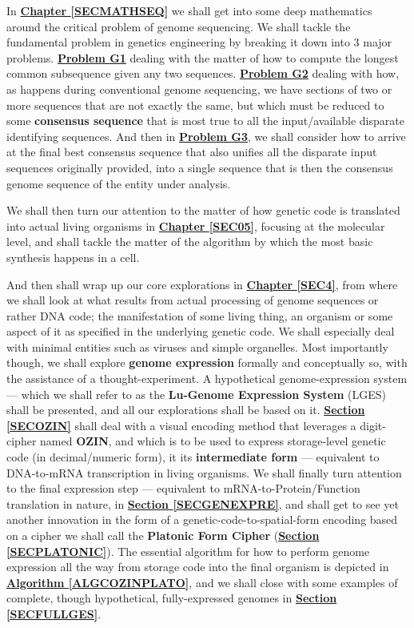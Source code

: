 \documentclass[a4paper, 18pt]{book} %
\begin{document}
In \textbf{\hyperref[SECMATHSEQ]{Chapter \ref{SECMATHSEQ}}} we shall get into some deep mathematics around the critical problem of genome sequencing. We shall tackle the fundamental problem in genetics engineering by breaking it down into 3 major problems. \textbf{\hyperref[PROBG1]{Problem G1}} dealing with the matter of how to compute the longest common subsequence given any two sequences. \textbf{\hyperref[PROBG2]{Problem G2}} dealing with how, as happens during conventional genome sequencing, we have sections of two or more sequences that are not exactly the same, but which must be reduced to some \textbf{consensus sequence} that is most true to all the input/available disparate identifying sequences. And then in \textbf{\hyperref[SECCOMPGENSEQ]{Problem G3}}, we shall consider how to arrive at the final best consensus sequence that also unifies all the disparate input sequences originally provided, into a single sequence that is then the consensus genome sequence of the entity under analysis.


We shall then turn our attention to the matter of how genetic code is translated into actual living organisms in \textbf{\hyperref[SEC05]{Chapter \ref{SEC05}}}, focusing at the molecular level, and shall tackle the matter of the algorithm by which the most basic synthesis happens in a cell.


And then shall wrap up our core explorations in \textbf{\hyperref[SEC4]{Chapter \ref{SEC4}}}, from where we shall look at what results from actual processing of genome sequences or rather DNA code; the manifestation of some living thing, an organism or some aspect of it as specified in the underlying genetic code. We shall especially deal with minimal entities such as viruses and simple organelles. Most importantly though, we shall explore \textbf{genome expression} formally and conceptually so, with the assistance of a thought-experiment. A hypothetical genome-expression system --- which we shall refer to as the \textbf{Lu-Genome Expression System} (LGES) shall be presented, and all our explorations shall be based on it. \textbf{\hyperref[SECOZIN]{Section \ref{SECOZIN}}} shall deal with a visual encoding method that leverages a digit-cipher named \textbf{OZIN}, and which is to be used to express storage-level genetic code (in decimal/numeric form), it its \textbf{intermediate form} --- equivalent to DNA-to-mRNA transcription in living organisms. We shall finally turn attention to the final expression step --- equivalent to mRNA-to-Protein/Function translation in nature, in \textbf{\hyperref[SECGENEXPRE]{Section \ref{SECGENEXPRE}}}, and shall get to see yet another innovation in the form of a genetic-code-to-spatial-form encoding based on a cipher we shall call the \textbf{Platonic Form Cipher} (\textbf{\hyperref[SECPLATONIC]{Section \ref{SECPLATONIC}}}). The essential algorithm for how to perform genome expression all the way from storage code into the final organism is depicted in \textbf{\hyperref[ALGCOZINPLATO]{Algorithm \ref{ALGCOZINPLATO}}}, and we shall close with some examples of complete, though hypothetical, fully-expressed genomes in \textbf{\hyperref[SECFULLGES]{Section \ref{SECFULLGES}}}.
\end{document}
